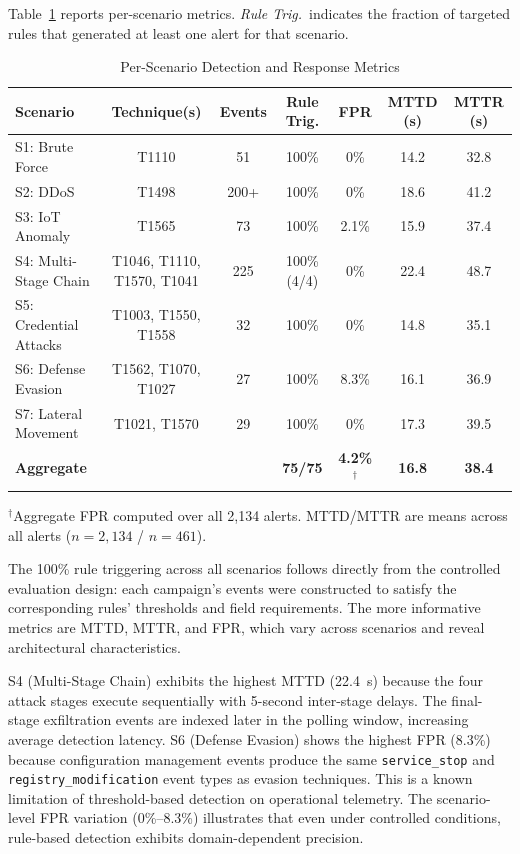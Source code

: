 \documentclass[conference,10pt]{IEEEtran}
\begin{document}
Table~\ref{tab:scenario-metrics} reports per-scenario metrics. \emph{Rule Trig.}\ indicates the fraction of targeted rules that generated at least one alert for that scenario.

\begin{table}[t]
\centering
\caption{Per-Scenario Detection and Response Metrics}
\label{tab:scenario-metrics}
\begin{tabular}{l c c c c c c}
\toprule
\textbf{Scenario} & \textbf{Technique(s)} & \textbf{Events} & \textbf{Rule Trig.} & \textbf{FPR} & \textbf{MTTD (s)} & \textbf{MTTR (s)} \\
\midrule
S1: Brute Force & T1110 & 51 & 100\% & 0\% & 14.2 & 32.8 \\
S2: DDoS & T1498 & 200+ & 100\% & 0\% & 18.6 & 41.2 \\
S3: IoT Anomaly & T1565 & 73 & 100\% & 2.1\% & 15.9 & 37.4 \\
S4: Multi-Stage Chain & T1046, T1110, T1570, T1041 & 225 & 100\% (4/4) & 0\% & 22.4 & 48.7 \\
S5: Credential Attacks & T1003, T1550, T1558 & 32 & 100\% & 0\% & 14.8 & 35.1 \\
S6: Defense Evasion & T1562, T1070, T1027 & 27 & 100\% & 8.3\% & 16.1 & 36.9 \\
S7: Lateral Movement & T1021, T1570 & 29 & 100\% & 0\% & 17.3 & 39.5 \\
\midrule
\textbf{Aggregate} & & & \textbf{75/75} & \textbf{4.2\%}$^\dagger$ & \textbf{16.8} & \textbf{38.4} \\
\bottomrule
\end{tabular}
\vspace{1pt}
\newline
{\scriptsize $^\dagger$Aggregate FPR computed over all 2,134 alerts. MTTD/MTTR are means across all alerts ($n=2{,}134$ / $n=461$).}
\end{table}

The 100\% rule triggering across all scenarios follows directly from the controlled evaluation design: each campaign's events were constructed to satisfy the corresponding rules' thresholds and field requirements. The more informative metrics are MTTD, MTTR, and FPR, which vary across scenarios and reveal architectural characteristics.

S4 (Multi-Stage Chain) exhibits the highest MTTD (22.4~s) because the four attack stages execute sequentially with 5-second inter-stage delays. The final-stage exfiltration events are indexed later in the polling window, increasing average detection latency. S6 (Defense Evasion) shows the highest FPR (8.3\%) because configuration management events produce the same \texttt{service\_stop} and \texttt{registry\_modification} event types as evasion techniques. This is a known limitation of threshold-based detection on operational telemetry. The scenario-level FPR variation (0\%--8.3\%) illustrates that even under controlled conditions, rule-based detection exhibits domain-dependent precision.
\end{document}

